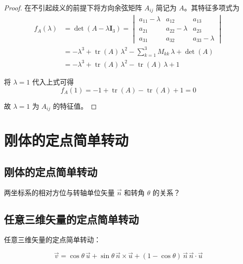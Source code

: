 \begin{proof}
在不引起歧义的前提下将方向余弦矩阵 $A_{ij}$ 简记为 $A$。其特征多项式为
\begin{align}
f_A(\lambda) &= \det(A - \lambda \boldsymbol{I}_3) = \begin{vmatrix} a_{11} - \lambda & a_{12} & a_{13} \\ a_{21} & a_{22} - \lambda & a_{23} \\ a_{31} & a_{32} & a_{33} - \lambda \end{vmatrix} \nonumber \\
&= -\lambda^3 + \operatorname{tr}(A)\, \lambda^2 - \sum_{k=1}^{3} M_{kk}\, \lambda + \det(A) \nonumber \\
&= -\lambda^3 + \operatorname{tr}(A)\, \lambda^2 - \operatorname{tr}(A)\, \lambda + 1
\end{align}

将 $\lambda = 1$ 代入上式可得
\begin{equation*}
f_A(1) = -1 + \operatorname{tr}(A) - \operatorname{tr}(A) + 1 = 0
\end{equation*}

故 $\lambda = 1$ 为 $A_{ij}$ 的特征值。
\end{proof}



\section{刚体的定点简单转动}

\subsection{刚体的定点简单转动}


两坐标系的相对方位与转轴单位矢量 $\vec{n}$ 和转角 $\theta$ 的关系？

\subsection{任意三维矢量的定点简单转动}


任意三维矢量的定点简单转动：
\begin{myformula}
\begin{equation}\label{eq:5.vector_rotation}
\vec{v} = \cos\theta\, \vec{u} + \sin\theta\, \vec{n} \times \vec{u} + (1 - \cos\theta)\, \vec{n}\, \vec{n} \cdot \vec{u}
\end{equation}
\end{myformula}


